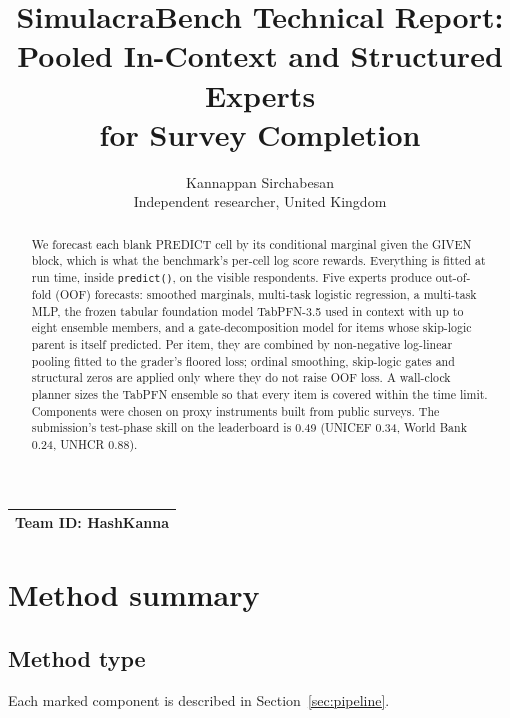 \documentclass{article}
\title{SimulacraBench Technical Report:\\ Pooled In-Context and Structured Experts\\ for Survey Completion}
\author{%
  Kannappan Sirchabesan\\
  Independent researcher, United Kingdom
}
\newcommand{\teamid}{HashKanna}
\newcommand{\TestSkill}{0.49}
\newcommand{\TestUNICEF}{0.34}
\newcommand{\TestWB}{0.24}
\newcommand{\TestUNHCR}{0.88}
\begin{document}
\maketitle

\begin{center}
\begin{tabular}{l}
\toprule
\textbf{Team ID:} \teamid \\
\bottomrule
\end{tabular}
\end{center}

\begin{abstract}
  We forecast each blank PREDICT cell by its conditional marginal given the GIVEN block, which
  is what the benchmark's per-cell log score rewards. Everything is fitted at run time, inside
  \texttt{predict()}, on the visible respondents. Five experts produce out-of-fold (OOF)
  forecasts: smoothed marginals, multi-task logistic regression, a multi-task MLP, the frozen
  tabular foundation model TabPFN-3.5 used in context with up to eight ensemble members, and a
  gate-decomposition model for items whose skip-logic parent is itself predicted. Per item, they
  are combined by non-negative log-linear pooling fitted to the grader's floored loss; ordinal
  smoothing, skip-logic gates and structural zeros are applied only where they do not raise OOF
  loss. A wall-clock planner sizes the TabPFN ensemble so that every item is covered within the
  time limit. Components were chosen on proxy instruments built from public surveys. The
  submission's test-phase skill on the leaderboard is \TestSkill{} (UNICEF \TestUNICEF, World
  Bank \TestWB, UNHCR \TestUNHCR).
\end{abstract}

\section{Method summary}
\label{sec:method}

\subsection{Method type}
Each marked component is described in Section~\ref{sec:pipeline}.
\end{document}
